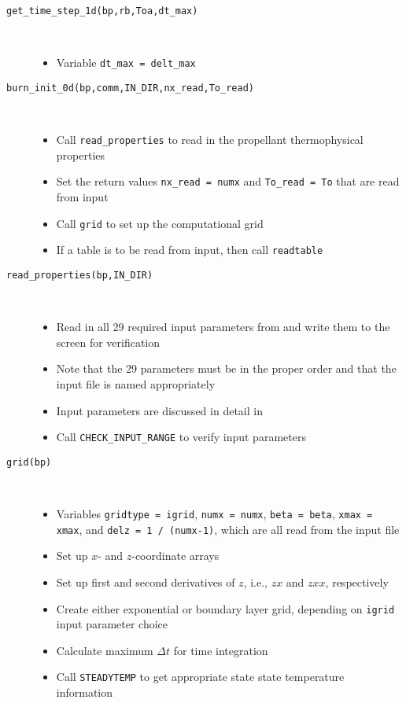 \begin{description}
\item[\texttt{get\_time\_step\_1d(bp,rb,Toa,dt\_max)}]{\hfill \\ \vspace{-15pt}
\begin{itemize}  
\item{Variable \texttt{dt\_max = delt\_max}}
\end{itemize}
}

\item[\texttt{burn\_init\_0d(bp,comm,IN\_DIR,nx\_read,To\_read)}]{\hfill \\ \vspace{-15pt}
\begin{itemize} 
\item{Call \texttt{read\_properties} to read in the propellant thermophysical properties}
\item{Set the return values \texttt{nx\_read = numx} and \texttt{To\_read = To} that are read from input}
\item{Call \texttt{grid} to set up the computational grid}
\item{If a table is to be read from input, then call \texttt{readtable}}
\end{itemize}
}

\item[\texttt{read\_properties(bp,IN\_DIR)}]{\hfill \\ \vspace{-15pt}
\begin{itemize} 
\item{Read in all 29 required input parameters from  and write them to the screen for verification}
\item{Note that the 29 parameters must be in the proper order and that the input file is named appropriately}
\item{Input parameters are discussed in detail in }
\item{Call \texttt{CHECK\_INPUT\_RANGE} to verify input parameters}
\end{itemize}
}

\item[\texttt{grid(bp)}]{\hfill \\ \vspace{-15pt}
\begin{itemize}
\item{Variables \texttt{gridtype = igrid}, \texttt{numx = numx}, \texttt{beta = beta}, \texttt{xmax = xmax}, and \texttt{delz = 1 / (numx-1)}, which are all read from the input file}
\item{Set up $x$- and $z$-coordinate arrays}
\item{Set up first and second derivatives of $z$, i.e., $zx$ and $zxx$, respectively}
\item{Create either exponential or boundary layer grid, depending on \texttt{igrid} input parameter choice}
\item{Calculate maximum $\Delta t$ for time integration}
\item{Call \texttt{STEADYTEMP} to get appropriate state state temperature information}
\end{itemize}
}


\end{description}
